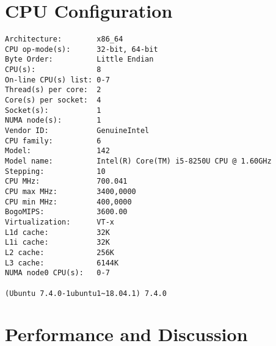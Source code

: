 \documentclass{article}
\begin{document}
\section{CPU Configuration}
\begin{verbatim}
Architecture:        x86_64
CPU op-mode(s):      32-bit, 64-bit
Byte Order:          Little Endian
CPU(s):              8
On-line CPU(s) list: 0-7
Thread(s) per core:  2
Core(s) per socket:  4
Socket(s):           1
NUMA node(s):        1
Vendor ID:           GenuineIntel
CPU family:          6
Model:               142
Model name:          Intel(R) Core(TM) i5-8250U CPU @ 1.60GHz
Stepping:            10
CPU MHz:             700.041
CPU max MHz:         3400,0000
CPU min MHz:         400,0000
BogoMIPS:            3600.00
Virtualization:      VT-x
L1d cache:           32K
L1i cache:           32K
L2 cache:            256K
L3 cache:            6144K
NUMA node0 CPU(s):   0-7

(Ubuntu 7.4.0-1ubuntu1~18.04.1) 7.4.0

\end{verbatim}
\newpage
\section{Performance and Discussion}
\end{document}
